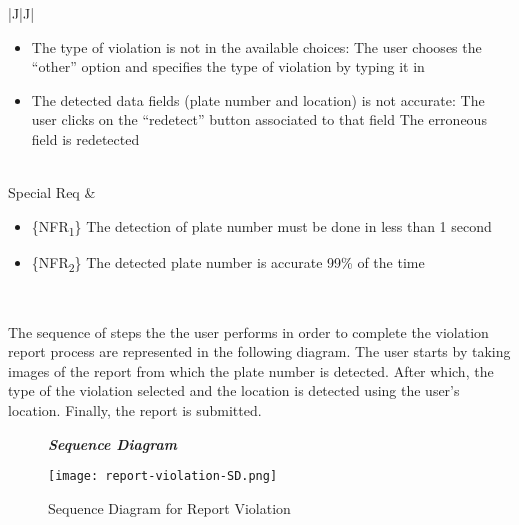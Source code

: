 \begin{table}[H]
\begin{tabulary}{\textwidth}{|J|J|}
\begin{minipage}[t]{0.8\textwidth}
\begin{itemize}
\item The type of violation is not in the available choices: The user chooses the “other” option and specifies the type of violation by typing it in
\item The detected data fields (plate number and location) is not accurate: The user clicks on the “redetect” button associated to that field The erroneous field is redetected\\
\end{itemize}
\end{minipage}\\
\hline
Special Req     & 
\begin{minipage}[t]{0.8\textwidth}
\begin{itemize}
\item \{NFR\textsubscript{1}\} The detection of plate number must be done in less than 1 second
\item \{NFR\textsubscript{2}\} The detected plate number is accurate 99\% of the time
\end{itemize}
\end{minipage}\\
\hline
\end{tabulary}
\caption{\label{tab:report-usecase}Usecase for Report Violation}
\end{table}

The sequence of steps the the user performs in order to complete the violation report process are represented in the following diagram. The user starts by taking images of the report from which the plate number is detected. After which, the type of the violation selected and the location is detected using the user's location. Finally, the report is submitted.


\begin{figure}[H]
\begin{flushleft}\emph{\textbf{Sequence Diagram}}\end{flushleft}
\caption{Sequence Diagram for Report Violation}
\label{fig:report-violation-SD}
\centering
\texttt{[image: report-violation-SD.png]}
\end{figure}


